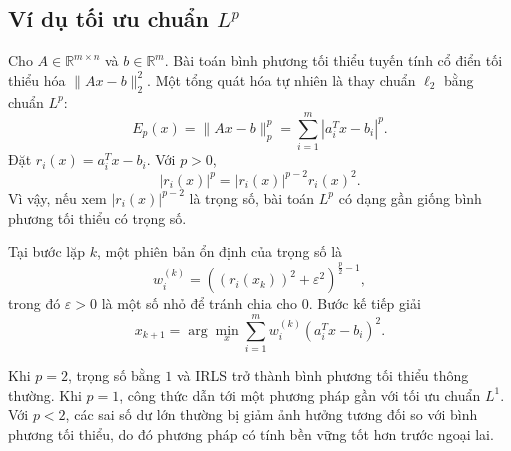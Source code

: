 \subsection{Ví dụ tối ưu chuẩn \texorpdfstring{$L^p$}{Lp}}
\label{SUB_SEC_lp_optimization}
Cho $A\in\mathbb{R}^{m\times n}$ và $b\in\mathbb{R}^{m}$. Bài toán bình phương tối thiểu tuyến tính cổ điển tối thiểu hóa $\|Ax-b\|_2^2$. Một tổng quát hóa tự nhiên là thay chuẩn $\ell_2$ bằng chuẩn $L^p$:
\begin{equation}
    E_p(x)=\|Ax-b\|_p^p
    =
    \sum_{i=1}^{m}|a_i^{T}x-b_i|^p.
    \label{eq_lp_objective}
\end{equation}
Đặt $r_i(x)=a_i^{T}x-b_i$. Với $p>0$,
\begin{equation}
    |r_i(x)|^p
    =
    |r_i(x)|^{p-2}r_i(x)^2.
    \label{eq_lp_as_weighted_square}
\end{equation}
Vì vậy, nếu xem $|r_i(x)|^{p-2}$ là trọng số, bài toán $L^p$ có dạng gần giống bình phương tối thiểu có trọng số.
\medskip

Tại bước lặp $k$, một phiên bản ổn định của trọng số là
\begin{equation}
    w_i^{(k)}
    =
    \left((r_i(x_k))^2+\varepsilon^2\right)^{\frac{p}{2}-1},
    \label{eq_lp_weight_smooth}
\end{equation}
trong đó $\varepsilon>0$ là một số nhỏ để tránh chia cho $0$. Bước kế tiếp giải
\begin{equation}
    x_{k+1}
    =
    \arg\min_x
    \sum_{i=1}^{m}w_i^{(k)}(a_i^{T}x-b_i)^2.
    \label{eq_lp_irls_step}
\end{equation}
\medskip

Khi $p=2$, trọng số bằng $1$ và IRLS trở thành bình phương tối thiểu thông thường. Khi $p=1$, công thức dẫn tới một phương pháp gần với tối ưu chuẩn $L^1$. Với $p<2$, các sai số dư lớn thường bị giảm ảnh hưởng tương đối so với bình phương tối thiểu, do đó phương pháp có tính bền vững tốt hơn trước ngoại lai.

